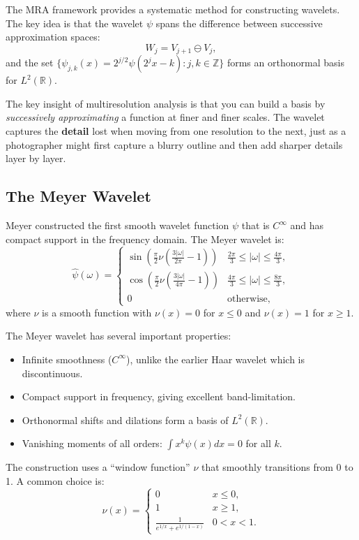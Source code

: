 The MRA framework provides a systematic method for constructing wavelets. The key idea is that the wavelet $\psi$ spans the difference between successive approximation spaces:
\[
W_j = V_{j+1} \ominus V_j,
\]
and the set $\{\psi_{j,k}(x) = 2^{j/2} \psi(2^j x - k) : j, k \in \mathbb{Z}\}$ forms an orthonormal basis for $L^2(\mathbb{R})$.

\begin{bigidea}
The key insight of multiresolution analysis is that you can build a
basis by \emph{successively approximating} a function at finer and
finer scales. The wavelet captures the \textbf{detail} lost when moving
from one resolution to the next, just as a photographer might first
capture a blurry outline and then add sharper details layer by layer.
\end{bigidea}

\subsection{The Meyer Wavelet}

Meyer constructed the first smooth wavelet function $\psi$ that is $C^\infty$ and has compact support in the frequency domain. The Meyer wavelet is:
\[
\hat\psi(\omega) = 
\begin{cases}
\sin\left(\frac{\pi}{2} \nu\left(\frac{3|\omega|}{2\pi} - 1\right)\right) & \frac{2\pi}{3} \leq |\omega| \leq \frac{4\pi}{3}, \\
\cos\left(\frac{\pi}{2} \nu\left(\frac{3|\omega|}{4\pi} - 1\right)\right) & \frac{4\pi}{3} \leq |\omega| \leq \frac{8\pi}{3}, \\
0 & \text{otherwise},
\end{cases}
\]
where $\nu$ is a smooth function with $\nu(x) = 0$ for $x \leq 0$ and $\nu(x) = 1$ for $x \geq 1$.

The Meyer wavelet has several important properties:
\begin{itemize}
\item Infinite smoothness ($C^\infty$), unlike the earlier Haar wavelet which is discontinuous.
\item Compact support in frequency, giving excellent band-limitation.
\item Orthonormal shifts and dilations form a basis of $L^2(\mathbb{R})$.
\item Vanishing moments of all orders: $\int x^k \psi(x) dx = 0$ for all $k$.
\end{itemize}

The construction uses a ``window function'' $\nu$ that smoothly transitions from 0 to 1. A common choice is:
\[
\nu(x) = 
\begin{cases}
0 & x \leq 0, \\
1 & x \geq 1, \\
\frac{1}{e^{1/x} + e^{1/(1-x)}} & 0 < x < 1.
\end{cases}
\]

